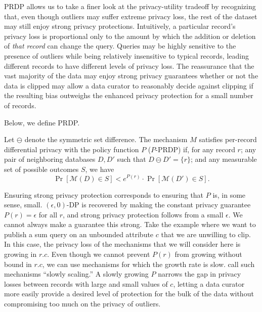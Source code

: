 \documentclass[11pt]{article}
\begin{document}
PRDP allows us to take a finer look at the privacy-utility tradeoff by recognizing that, even though outliers may suffer extreme privacy loss, the rest of the dataset may still enjoy strong privacy protections. Intuitively, a particular record's privacy loss is proportional only to the amount by which the addition or deletion of \textit{that record} can change the query. Queries may be highly sensitive to the presence of outliers while being relatively insensitive to typical records, leading different records to have different levels of privacy loss. The reassurance that the vast majority of the data may enjoy strong privacy guarantees whether or not the data is clipped may allow a data curator to reasonably decide against clipping if the resulting bias outweighs the enhanced privacy protection for a small number of records.

Below, we define PRDP.

\begin{definition}
\label{def:PRDP}
Let $\ominus$ denote the symmetric set difference. The mechanism $M$ satisfies per-record differential privacy with the policy function $P$ ($P$-PRDP) if, for any record $r$; any pair of neighboring databases $D, D'$ such that $D \ominus D' = \{r\}$; and any measurable set of possible outcomes $S$, we have
$$
\Pr[\mathcal{M}(D) \in S] < e^{P(r)} \cdot \Pr[\mathcal{M}(D') \in S].
$$
\end{definition}

Ensuring strong privacy protection corresponds to ensuring that $P$ is, in some sense, small. $(\epsilon,0)$-DP is recovered by making the constant privacy guarantee $P(r) = \epsilon$ for all $r$, and strong privacy protection follows from a small $\epsilon$. We cannot always make a guarantee this strong. Take the example where we want to publish a sum query on an unbounded attribute $c$ that we are unwilling to clip. In this case, the privacy loss of the mechanisms that we will consider here is growing in $r.c$. Even though we cannot prevent $P(r)$ from growing without bound in $r.c$, we can use mechanisms for which the growth rate is slow. \cite{finleyEtAl2024} call such mechanisms ``slowly scaling.'' A slowly growing $P$ narrows the gap in privacy losses between records with large and small values of $c$, letting a data curator more easily provide a desired level of protection for the bulk of the data without compromising too much on the privacy of outliers.
\end{document}
